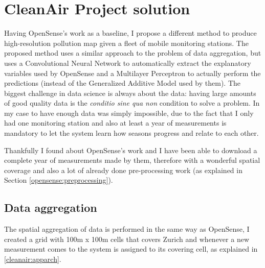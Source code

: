 \documentclass[11pt,a4paper,titlepage]{book}
\begin{document}
\section{CleanAir Project solution}
Having OpenSense's work as a baseline, I propose a different method to produce high-resolution pollution map given a fleet of mobile monitoring stations.
\newline
\newline
The proposed method uses a similar approach to the problem of data aggregation, but uses a Convolutional Neural Network to automatically extract the explanatory variables used by OpenSense and a Multilayer Perceptron to actually perform the predictions (instead of the Generalized Additive Model used by them).
\newline
\newline
The biggest challenge in data science is always about the data: having large amounts of good quality data is the \textit{conditio sine qua non} condition to solve a problem. In my case to have enough data was simply impossible, due to the fact that I only had one monitoring station and also at least a year of measurements is mandatory to let the system learn how seasons progress and relate to each other.

Thankfully I found about OpenSense's work and I have been able to download a complete year of measurements made by them, therefore with a wonderful spatial coverage and also a lot of already done pre-processing work (as explained in Section \ref{opensense:preprocessing}). 

\subsection{Data aggregation}
The spatial aggregation of data is performed in the same way as OpenSense, I created a grid with 100m x 100m cells that covers Zurich and whenever a new measurement comes to the system is assigned to its covering cell, as explained in \ref{cleanair:apparch}.
\end{document}
